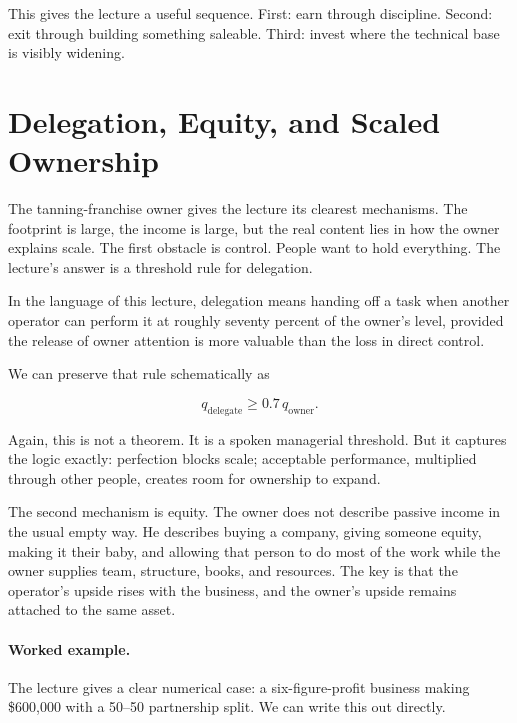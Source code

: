 This gives the lecture a useful sequence. First: earn through discipline. Second: exit through building something saleable. Third: invest where the technical base is visibly widening.

\section{Delegation, Equity, and Scaled Ownership}

The tanning-franchise owner gives the lecture its clearest mechanisms. The footprint is large, the income is large, but the real content lies in how the owner explains scale. The first obstacle is control. People want to hold everything. The lecture's answer is a threshold rule for delegation.

\begin{definition}
In the language of this lecture, delegation means handing off a task when another operator can perform it at roughly seventy percent of the owner's level, provided the release of owner attention is more valuable than the loss in direct control.
\end{definition}

We can preserve that rule schematically as

\begin{equation}
q_{\mathrm{delegate}} \ge 0.7\,q_{\mathrm{owner}}.
\end{equation}

Again, this is not a theorem. It is a spoken managerial threshold. But it captures the logic exactly: perfection blocks scale; acceptable performance, multiplied through other people, creates room for ownership to expand.

The second mechanism is equity. The owner does not describe passive income in the usual empty way. He describes buying a company, giving someone equity, making it their baby, and allowing that person to do most of the work while the owner supplies team, structure, books, and resources. The key is that the operator's upside rises with the business, and the owner's upside remains attached to the same asset.

\paragraph{Worked example.} The lecture gives a clear numerical case: a six-figure-profit business making \$600{,}000 with a 50--50 partnership split. We can write this out directly.

